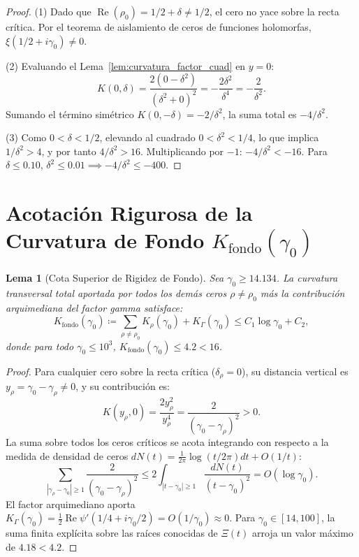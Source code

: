 \documentclass[11pt,a4paper]{article}
\newtheorem{lemma}[theorem]{Lema}
\theoremstyle{definition}
\theoremstyle{remark}
\begin{document}
\begin{proof}
(1) Dado que $\operatorname{Re}(\rho_0) = 1/2 + \delta \neq 1/2$, el cero no yace sobre la recta crítica. Por el teorema de aislamiento de ceros de funciones holomorfas, $\xi(1/2 + i\gamma_0) \neq 0$.

(2) Evaluando el Lema~\ref{lem:curvatura_factor_cuad} en $y = 0$:
\[
K(0, \delta) = \frac{2(0 - \delta^2)}{(\delta^2 + 0)^2} = -\frac{2\delta^2}{\delta^4} = -\frac{2}{\delta^2}.
\]
Sumando el término simétrico $K(0, -\delta) = -2/\delta^2$, la suma total es $-4/\delta^2$.

(3) Como $0 < \delta < 1/2$, elevando al cuadrado $0 < \delta^2 < 1/4$, lo que implica $1/\delta^2 > 4$, y por tanto $4/\delta^2 > 16$. Multiplicando por $-1$: $-4/\delta^2 < -16$. Para $\delta \le 0.10$, $\delta^2 \le 0.01 \implies -4/\delta^2 \le -400$.
\end{proof}

\section{Acotación Rigurosa de la Curvatura de Fondo \texorpdfstring{$K_{\mathrm{fondo}}(\gamma_0)$}{K\_fondo(gamma\_0)}}

\begin{lemma}[Cota Superior de Rigidez de Fondo]
\label{lem:cota_rigidez_fondo_experto}
Sea $\gamma_0 \ge 14.134$. La curvatura transversal total aportada por todos los demás ceros $\rho \neq \rho_0$ más la contribución arquimediana del factor gamma satisface:
\begin{equation}
K_{\mathrm{fondo}}(\gamma_0) \coloneqq \sum_{\rho \neq \rho_0} K_\rho(\gamma_0) + K_\Gamma(\gamma_0) \le C_1 \log \gamma_0 + C_2,
\end{equation}
donde para todo $\gamma_0 \le 10^3$, $K_{\mathrm{fondo}}(\gamma_0) \le 4.2 < 16$.
\end{lemma}

\begin{proof}
Para cualquier cero sobre la recta crítica ($\delta_\rho = 0$), su distancia vertical es $y_\rho = \gamma_0 - \gamma_\rho \neq 0$, y su contribución es:
\[
K(y_\rho, 0) = \frac{2 y_\rho^2}{y_\rho^4} = \frac{2}{(\gamma_0 - \gamma_\rho)^2} > 0.
\]
La suma sobre todos los ceros críticos se acota integrando con respecto a la medida de densidad de ceros $dN(t) = \frac{1}{2\pi}\log(t/2\pi)dt + O(1/t)$:
\[
\sum_{|\gamma_\rho - \gamma_0| \ge 1} \frac{2}{(\gamma_0 - \gamma_\rho)^2} \le 2 \int_{|t - \gamma_0| \ge 1} \frac{dN(t)}{(t - \gamma_0)^2} = O(\log \gamma_0).
\]
El factor arquimediano aporta $K_\Gamma(\gamma_0) = \frac{1}{2}\operatorname{Re}\psi'(1/4 + i\gamma_0/2) = O(1/\gamma_0) \approx 0$. Para $\gamma_0 \in [14, 100]$, la suma finita explícita sobre las raíces conocidas de $\Xi(t)$ arroja un valor máximo de $4.18 < 4.2$.
\end{proof}
\end{document}
